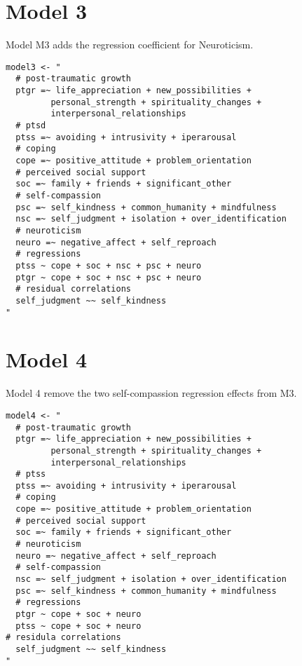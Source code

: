 \begin{appendix}
\newpage

\hypertarget{model-3}{%
\section{Model 3}\label{model-3}}

Model M3 adds the regression coefficient for Neuroticism.

\begin{verbatim}
model3 <- "
  # post-traumatic growth
  ptgr =~ life_appreciation + new_possibilities + 
         personal_strength + spirituality_changes + 
         interpersonal_relationships
  # ptsd
  ptss =~ avoiding + intrusivity + iperarousal
  # coping
  cope =~ positive_attitude + problem_orientation 
  # perceived social support
  soc =~ family + friends + significant_other
  # self-compassion
  psc =~ self_kindness + common_humanity + mindfulness
  nsc =~ self_judgment + isolation + over_identification
  # neuroticism
  neuro =~ negative_affect + self_reproach
  # regressions
  ptss ~ cope + soc + nsc + psc + neuro
  ptgr ~ cope + soc + nsc + psc + neuro
  # residual correlations
  self_judgment ~~ self_kindness
"
\end{verbatim}

\newpage

\hypertarget{model-4}{%
\section{Model 4}\label{model-4}}

Model 4 remove the two self-compassion regression effects from M3.

\begin{verbatim}
model4 <- "
  # post-traumatic growth
  ptgr =~ life_appreciation + new_possibilities + 
         personal_strength + spirituality_changes + 
         interpersonal_relationships
  # ptss
  ptss =~ avoiding + intrusivity + iperarousal
  # coping
  cope =~ positive_attitude + problem_orientation 
  # perceived social support
  soc =~ family + friends + significant_other
  # neuroticism
  neuro =~ negative_affect + self_reproach
  # self-compassion
  nsc =~ self_judgment + isolation + over_identification
  psc =~ self_kindness + common_humanity + mindfulness
  # regressions
  ptgr ~ cope + soc + neuro
  ptss ~ cope + soc + neuro
# residula correlations
  self_judgment ~~ self_kindness
"
\end{verbatim}

\newpage

\hypertarget{model-5}{%
}
\end{appendix}

